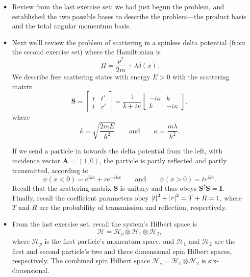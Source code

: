 \documentclass[11pt, a4paper]{article}
\newcommand{\eqtext}[1]{\qquad \text{#1} \qquad}
\renewcommand{\vec}[1]{\bm{#1}} %
\newcommand{\mat}[1]{\mathbf{#1}} %
\renewcommand{\H}{\mathcal{H}}  %
\begin{document}
\begin{itemize}
	\item Review from the last exercise set: we had just begun the problem, and established the two possible bases to describe the problem---the product basis and the total angular momentum basis.
	
	\item Next we'll review the problem of scattering in a spinless delta potential (from the second exercise set) where the Hamiltonian is
	\begin{equation*}
		H = \frac{p^{2}}{2m} + \lambda \delta (x).
	\end{equation*}
	We describe free scattering states with energy $ E > 0 $ with the scattering matrix
	\begin{equation*}
		\mat{S} = 
		\begin{bmatrix}
			r & t'\\
			t & r'
		\end{bmatrix}
		 = 
		 \frac{1}{k + i \kappa}
		 \begin{bmatrix}
		 	- i\kappa & k\\
		 	k	& - i\kappa
		 \end{bmatrix},
	\end{equation*}
	where 
	\begin{equation*}
		k = \sqrt{\frac{2mE}{\hbar^{2}}} \eqtext{and} \kappa = \frac{m\lambda}{\hbar^{2}}.
	\end{equation*}
	
	
	If we send a particle in towards the delta potential from the left, with incidence vector $ \vec{A} = (1, 0) $, the particle is partly reflected and partly transmitted, according to
	\begin{equation*}
		\psi(x < 0) = e^{ikx} + re^{-ikx} \eqtext{and} \psi(x>0) = te^{ikx}.
	\end{equation*}
	Recall that the scattering matrix $ \mat{S} $ is unitary and thus obeys $ \mat{S}^{\dagger}\mat{S} = \mat{I} $. Finally, recall the coefficient parameters obey $ \abs{t}^{2} + \abs{r}^{2} = T + R = 1 $, where $ T $ and $ R $ are the probability of transmission and reflection, respectively.
	
	\item From the last exercise set, recall the system's Hilbert space is
	\begin{equation*}
		\H = \H_{p} \otimes \H_{1} \otimes \H_{2},
	\end{equation*}
	where $ \H_{p} $ is the first particle's momentum space, and $ \H_{1} $ and $ \H_{2} $ are the first and second particle's two and three dimensional spin Hilbert spaces, respectively. The combined spin Hilbert space $ \H_{s} = \H_{1} \otimes \H_{2} $ is six-dimensional.
	

\end{itemize}
\end{document}
